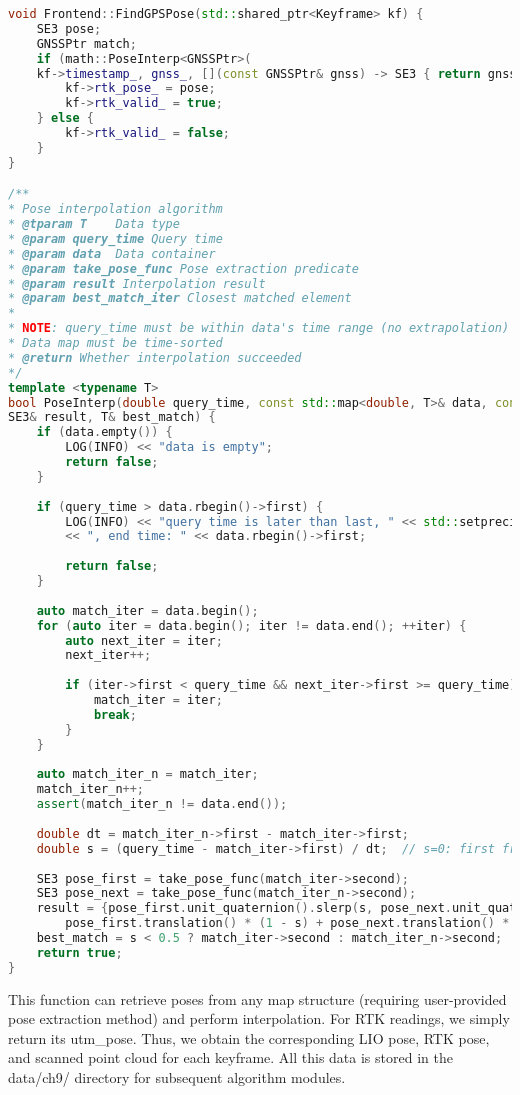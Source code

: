 \begin{lstlisting}[language=c++,caption=src/ch9/frontend.cc]
void Frontend::FindGPSPose(std::shared_ptr<Keyframe> kf) {
	SE3 pose;
	GNSSPtr match;
	if (math::PoseInterp<GNSSPtr>(
	kf->timestamp_, gnss_, [](const GNSSPtr& gnss) -> SE3 { return gnss->utm_pose_; }, pose, match)) {
		kf->rtk_pose_ = pose;
		kf->rtk_valid_ = true;
	} else {
		kf->rtk_valid_ = false;
	}
}

/**
* Pose interpolation algorithm
* @tparam T    Data type
* @param query_time Query time
* @param data  Data container
* @param take_pose_func Pose extraction predicate
* @param result Interpolation result
* @param best_match_iter Closest matched element
*
* NOTE: query_time must be within data's time range (no extrapolation)
* Data map must be time-sorted
* @return Whether interpolation succeeded
*/
template <typename T>
bool PoseInterp(double query_time, const std::map<double, T>& data, const std::function<SE3(const T&)>& take_pose_func,
SE3& result, T& best_match) {
	if (data.empty()) {
		LOG(INFO) << "data is empty";
		return false;
	}
	
	if (query_time > data.rbegin()->first) {
		LOG(INFO) << "query time is later than last, " << std::setprecision(18) << ", query: " << query_time
		<< ", end time: " << data.rbegin()->first;
		
		return false;
	}
	
	auto match_iter = data.begin();
	for (auto iter = data.begin(); iter != data.end(); ++iter) {
		auto next_iter = iter;
		next_iter++;
		
		if (iter->first < query_time && next_iter->first >= query_time) {
			match_iter = iter;
			break;
		}
	}
	
	auto match_iter_n = match_iter;
	match_iter_n++;
	assert(match_iter_n != data.end());
	
	double dt = match_iter_n->first - match_iter->first;
	double s = (query_time - match_iter->first) / dt;  // s=0: first frame, s=1: next frame
	
	SE3 pose_first = take_pose_func(match_iter->second);
	SE3 pose_next = take_pose_func(match_iter_n->second);
	result = {pose_first.unit_quaternion().slerp(s, pose_next.unit_quaternion()),
		pose_first.translation() * (1 - s) + pose_next.translation() * s};
	best_match = s < 0.5 ? match_iter->second : match_iter_n->second;
	return true;
}
\end{lstlisting}

This function can retrieve poses from any map structure (requiring user-provided pose extraction method) and perform interpolation. For RTK readings, we simply return its utm_pose. Thus, we obtain the corresponding LIO pose, RTK pose, and scanned point cloud for each keyframe. All this data is stored in the data/ch9/ directory for subsequent algorithm modules.

